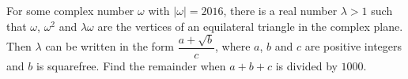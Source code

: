 For some complex number $\omega$ with $|\omega|=2016$, there is a real number $\lambda>1$ such that $\omega$, $\omega^2$ and $\lambda\omega$ are the vertices of an equilateral triangle in the complex plane. Then $\lambda$ can be written in the form $\dfrac{a+\sqrt b}{c}$, where $a$, $b$ and $c$ are positive integers and $b$ is squarefree. Find the remainder when $a+b+c$ is divided by $1000$.
